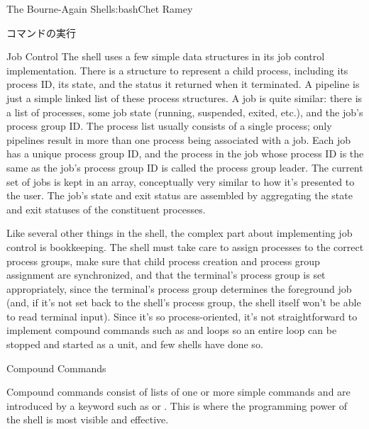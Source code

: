 \begin{aosachapter}{The Bourne-Again Shell}{s:bash}{Chet Ramey}
\begin{aosasect1}{コマンドの実行}
\begin{aosasect2}{Job Control}
The shell uses a few simple data structures in its job control
implementation.  There is a structure to represent a child process,
including its process ID, its state, and the status it returned when
it terminated.  A pipeline is just a simple linked list of these
process structures.  A job is quite similar: there is a list of
processes, some job state (running, suspended, exited, etc.), and the
job's process group ID\@.  The process list usually consists of a single
process; only pipelines result in more than one process being
associated with a job.  Each job has a unique process group ID, and
the process in the job whose process ID is the same as the job's
process group ID is called the process group leader.  The current set
of jobs is kept in an array, conceptually very similar to how it's
presented to the user.  The job's state and exit status are assembled
by aggregating the state and exit statuses of the constituent
processes.

Like several other things in the shell, the complex part about
implementing job control is bookkeeping.  The shell must take care to
assign processes to the correct process groups, make sure that child
process creation and process group assignment are synchronized, and
that the terminal's process group is set appropriately, since the
terminal's process group determines the foreground job (and, if it's
not set back to the shell's process group, the shell itself won't be
able to read terminal input).  Since it's so process-oriented, it's
not straightforward to implement compound commands such as
 and  loops so an entire loop can be stopped and
started as a unit, and few shells have done so.

\end{aosasect2}

\begin{aosasect2}{Compound Commands}

Compound commands consist of lists of one or more simple commands and
are introduced by a keyword such as  or .  This
is where the programming power of the shell is most visible and
effective.


\end{aosasect2}
\end{aosasect1}
\end{aosachapter}
